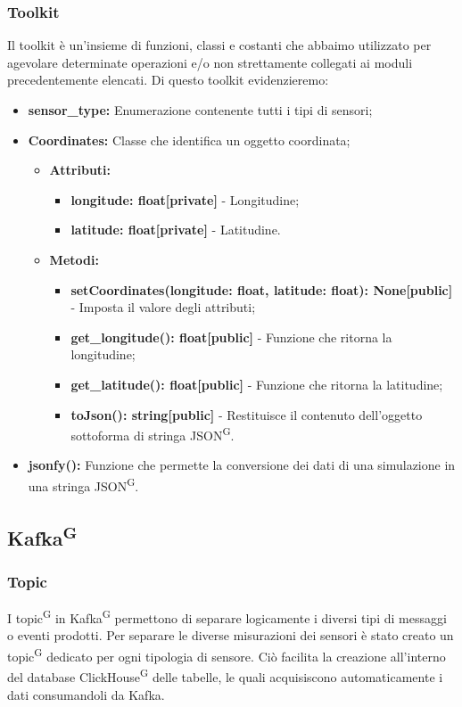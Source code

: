 \documentclass[8pt]{article}
\newcommand{\glossterm}[1]{#1\textsuperscript{G}} %
\begin{document}
\subsubsection{Toolkit}
Il toolkit è un'insieme di funzioni, classi e costanti che abbaimo utilizzato per agevolare determinate operazioni e/o non strettamente collegati ai moduli precedentemente elencati.
Di questo toolkit evidenzieremo:
\begin{itemize}
	\setlength\itemsep{0em}
    \item \textbf{sensor\_type:} Enumerazione contenente tutti i tipi di sensori;
    \item \textbf{Coordinates:} Classe che identifica un oggetto coordinata;
    \begin{itemize}
	\setlength\itemsep{0em}
        \item \textbf{Attributi:}
        \begin{itemize}
	\setlength\itemsep{0em}
            \item \textbf{longitude: float[private]} - Longitudine;
            \item \textbf{latitude: float[private]} - Latitudine.
        \end{itemize}
        \item \textbf{Metodi:}
        \begin{itemize}
	\setlength\itemsep{0em}
            \item \textbf{setCoordinates(longitude: float, latitude: float): None[public]} - Imposta il valore degli attributi;
            \item \textbf{get\_longitude(): float[public]} - Funzione che ritorna la longitudine;
            \item \textbf{get\_latitude(): float[public]} - Funzione che ritorna la latitudine;
            \item \textbf{toJson(): string[public]} - Restituisce il contenuto dell'oggetto sottoforma di stringa \glossterm{JSON}.
        \end{itemize}
    \end{itemize}
    \item \textbf{jsonfy():} Funzione che permette la conversione dei dati di una simulazione in una stringa \glossterm{JSON}.
\end{itemize}
\subsection{\glossterm{Kafka}}
\subsubsection{Topic}
I \glossterm{topic} in \glossterm{Kafka} permettono di separare logicamente i diversi tipi di messaggi o eventi prodotti. Per separare le diverse misurazioni dei sensori è stato creato un \glossterm{topic} dedicato per ogni tipologia di sensore.
Ciò facilita la creazione all’interno del database \glossterm{ClickHouse} delle tabelle, le quali acquisiscono automaticamente i dati consumandoli da Kafka.
\end{document}
